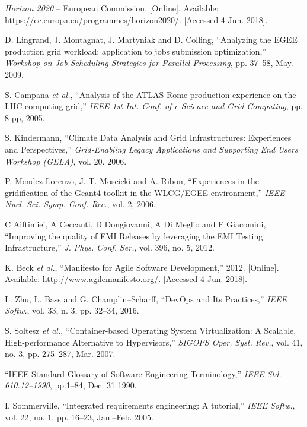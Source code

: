 \documentclass[journal]{IEEEtran}
\begin{document}
\begin{thebibliography}{1}

\emph{Horizon 2020} -- European Commission.
[Online]. Available: \url{https://ec.europa.eu/programmes/horizon2020/}.
[Accessed 4 Jun. 2018].

D. Lingrand, J. Montagnat, J. Martyniak and D. Colling,
``Analyzing the EGEE production grid workload: application to jobs submission optimization,''
\emph{Workshop on Job Scheduling Strategies for Parallel Processing},
pp. 37--58, May. 2009.

S. Campana  \emph{et al.},
``Analysis of the ATLAS Rome production experience on the LHC computing grid,''
\emph{IEEE 1st Int. Conf. of e-Science and Grid Computing},
pp. 8-pp, 2005.

S. Kindermann,
``Climate Data Analysis and Grid Infrastructures: Experiences and Perspectives,''
\emph{Grid-Enabling Legacy Applications and Supporting End Users Workshop (GELA)},
vol. 20. 2006.

P. Mendez-Lorenzo, J. T. Moscicki and A. Ribon,
``Experiences in the gridification of the Geant4 toolkit in the WLCG/EGEE environment,''
\emph{IEEE Nucl. Sci. Symp. Conf. Rec.},
vol. 2, 2006.

C Aiftimiei, A Ceccanti, D Dongiovanni, A Di Meglio and F Giacomini,
``Improving the quality of EMI Releases by leveraging the EMI Testing Infrastructure,''
\emph{J. Phys. Conf. Ser.},
vol. 396, no. 5, 2012.

K. Beck \emph{et al.},
``Manifesto for Agile Software Development,'' 2012.
[Online]. Available: \url{http://www.agilemanifesto.org/}.
[Accessed 4 Jun. 2018].

L. Zhu, L. Bass and G. Champlin--Scharff,
``DevOps and Its Practices,''
\emph{IEEE Softw.},
vol. 33, n. 3, pp. 32--34, 2016.

S. Soltesz \emph{et al.},
``Container-based Operating System Virtualization: A Scalable, High-performance Alternative to Hypervisors,''
\emph{SIGOPS Oper. Syst. Rev.},
vol. 41, no. 3, pp. 275--287, Mar. 2007.

``IEEE Standard Glossary of Software Engineering Terminology,''
\emph{IEEE Std. 610.12--1990}, pp.1--84, Dec. 31 1990.

I. Sommerville,
``Integrated requirements engineering: A tutorial,''
\emph{IEEE Softw.}, vol. 22, no. 1, pp. 16--23, Jan.--Feb. 2005.


\end{thebibliography}
\end{document}
